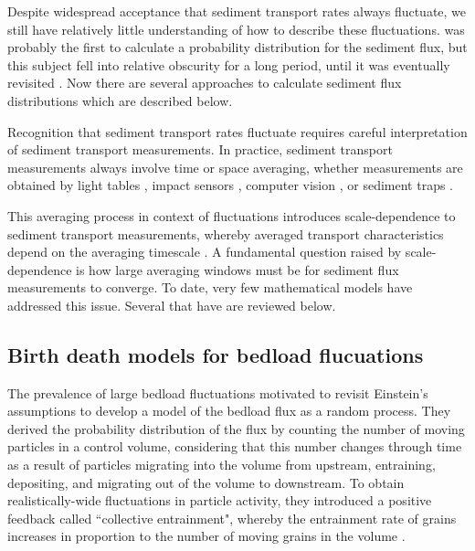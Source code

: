 Despite widespread acceptance that sediment transport rates always fluctuate, we still have relatively little understanding of how to describe these fluctuations. \citet{Hamamori1962} was probably the first to calculate a probability distribution for the sediment flux, but this subject fell into relative obscurity for a long period, until it was eventually revisited \citep{Nikora1997,Ancey2006}. Now there are several approaches to calculate sediment flux distributions which are described below.

Recognition that sediment transport rates fluctuate requires careful interpretation of sediment transport measurements. 
In practice, sediment transport measurements always involve time or space averaging, whether measurements are obtained by light tables \citep{Chartrand2018}, impact sensors \citep{Rickenmann2007}, computer vision \citep{Roseberry2012}, or sediment traps \citep{Papangelakis2016}.

This averaging process in context of fluctuations introduces scale-dependence to sediment transport measurements, whereby averaged transport characteristics depend on the averaging timescale \citep{Turowski2010,Campagnol2012,Ancey2020a}.
A fundamental question raised by scale-dependence is how large averaging windows must be for sediment flux measurements to converge.
To date, very few mathematical models have addressed this issue. Several that have are reviewed below.

\subsection{Birth death models for bedload flucuations}

The prevalence of large bedload fluctuations motivated \citet{Ancey2006,Ancey2008} to revisit Einstein's assumptions to develop a model of the bedload flux as a random process.
They derived the probability distribution of the flux by counting the number of moving particles in a control volume, considering that this number changes through time as a result of particles migrating into the volume from upstream, entraining, depositing, and migrating out of the volume to downstream.
To obtain realistically-wide fluctuations in particle activity, they introduced a positive feedback called ``collective entrainment", whereby the entrainment rate of grains increases in proportion to the number of moving grains in the volume \citep{Ancey2008,Heyman2013}.


